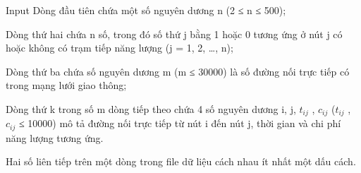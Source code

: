 Input
Dòng đầu tiên chứa một số nguyên dương n (2 ≤ n ≤ 500);

Dòng thứ hai chứa n số, trong đó số thứ j bằng 1 hoặc 0 tương ứng ở nút j có hoặc không có trạm tiếp năng lượng (j = 1, 2, …, n);

Dòng thứ ba chứa số nguyên dương m (m ≤ 30000) là số đường nối trực tiếp có trong mạng lưới giao thông;

Dòng thứ k trong số m dòng tiếp theo chứa 4 số nguyên dương i, j, $t_{ij}$ , $c_{ij}$ ($t_{ij}$ , $c_{ij}$ ≤ 10000) mô tả đường nối trực tiếp từ nút i đến nút j, thời gian và chi phí năng lượng tương ứng.

Hai số liên tiếp trên một dòng trong file dữ liệu cách nhau ít nhất một dấu cách.
